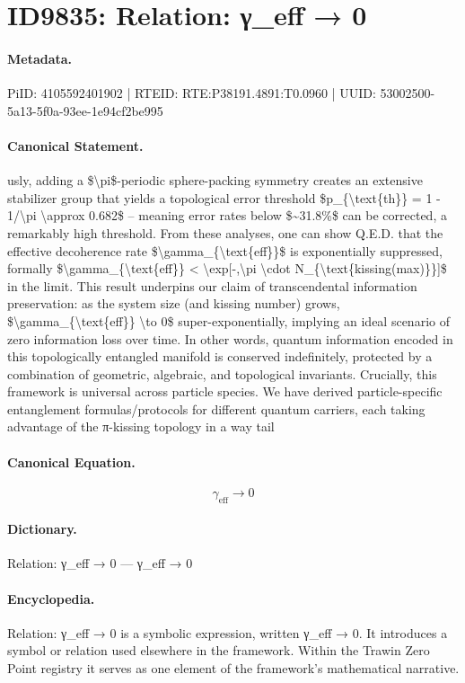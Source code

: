 \section*{ID9835: Relation: γ\_eff → 0}
\paragraph{Metadata.}
PiID: 4105592401902 | RTEID: RTE:P38191.4891:T0.0960 | UUID: 53002500-5a13-5f0a-93ee-1e94cf2be995

\paragraph{Canonical Statement.}
usly, adding a \$\textbackslash{}pi\$-periodic sphere-packing symmetry creates an extensive stabilizer group that yields a topological error threshold \$p\_\{\textbackslash{}text\{th\}\} = 1 - 1/\textbackslash{}pi \textbackslash{}approx 0.682\$ – meaning error rates below \$\textasciitilde{}31.8\%\$ can be corrected, a remarkably high threshold. From these analyses, one can show Q.E.D. that the effective decoherence rate \$\textbackslash{}gamma\_\{\textbackslash{}text\{eff\}\}\$ is exponentially suppressed, formally \$\textbackslash{}gamma\_\{\textbackslash{}text\{eff\}\} < \textbackslash{}exp[-,\textbackslash{}pi \textbackslash{}cdot N\_\{\textbackslash{}text\{kissing(max)\}\}]\$ in the limit. This result underpins our claim of transcendental information preservation: as the system size (and kissing number) grows, \$\textbackslash{}gamma\_\{\textbackslash{}text\{eff\}\} \textbackslash{}to 0\$ super-exponentially, implying an ideal scenario of zero information loss over time. In other words, quantum information encoded in this topologically entangled manifold is conserved indefinitely, protected by a combination of geometric, algebraic, and topological invariants. Crucially, this framework is universal across particle species. We have derived particle-specific entanglement formulas/protocols for different quantum carriers, each taking advantage of the π-kissing topology in a way tail

\paragraph{Canonical Equation.}
\[
\gamma_{\text{eff}} \to 0
\]

\paragraph{Dictionary.}
Relation: γ\_eff → 0 — γ\_eff → 0

\paragraph{Encyclopedia.}
Relation: γ\_eff → 0 is a symbolic expression, written γ\_eff → 0. It introduces a symbol or relation used elsewhere in the framework. Within the Trawin Zero Point registry it serves as one element of the framework's mathematical narrative.
